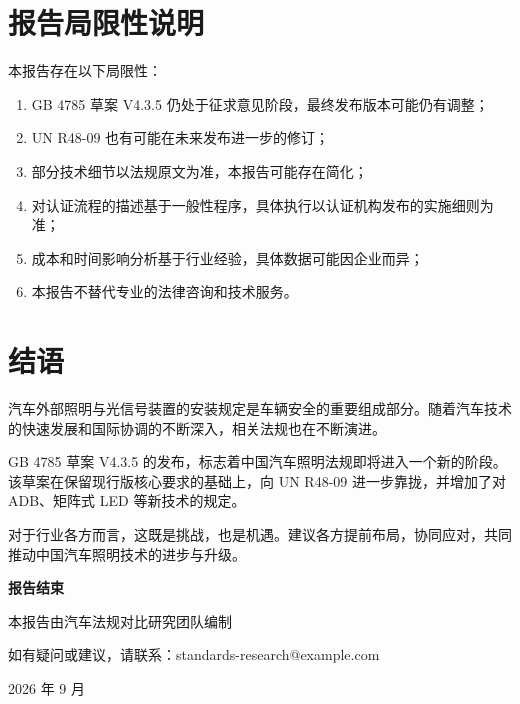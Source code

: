 \section{报告局限性说明}

本报告存在以下局限性：

\begin{enumerate}[leftmargin=2em]
    \item GB 4785 草案 V4.3.5 仍处于征求意见阶段，最终发布版本可能仍有调整；
    \item UN R48-09 也有可能在未来发布进一步的修订；
    \item 部分技术细节以法规原文为准，本报告可能存在简化；
    \item 对认证流程的描述基于一般性程序，具体执行以认证机构发布的实施细则为准；
    \item 成本和时间影响分析基于行业经验，具体数据可能因企业而异；
    \item 本报告不替代专业的法律咨询和技术服务。
\end{enumerate}

\section{结语}

汽车外部照明与光信号装置的安装规定是车辆安全的重要组成部分。随着汽车技术的快速发展和国际协调的不断深入，相关法规也在不断演进。

GB 4785 草案 V4.3.5 的发布，标志着中国汽车照明法规即将进入一个新的阶段。该草案在保留现行版核心要求的基础上，向 UN R48-09 进一步靠拢，并增加了对 ADB、矩阵式 LED 等新技术的规定。

对于行业各方而言，这既是挑战，也是机遇。建议各方提前布局，协同应对，共同推动中国汽车照明技术的进步与升级。

\vspace{2cm}

\begin{center}
\textbf{报告结束}

\vspace{0.5cm}

本报告由汽车法规对比研究团队编制

如有疑问或建议，请联系：standards-research@example.com

2026 年 9 月
\end{center}